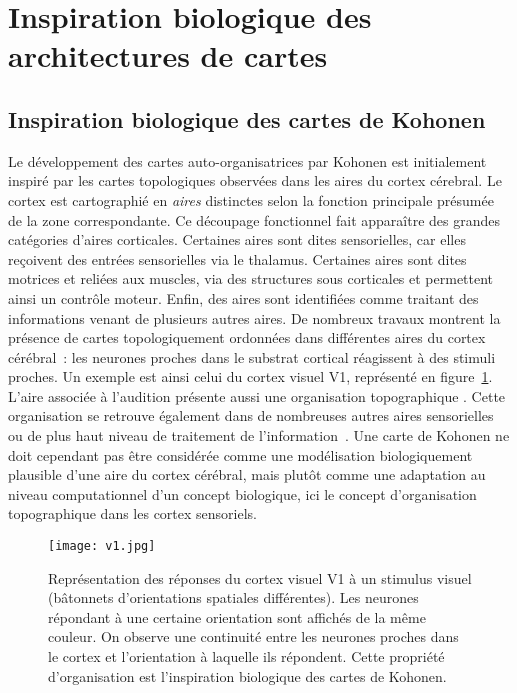 \documentclass[../main]{subfiles}
\begin{document}
\section{Inspiration biologique des architectures de cartes}\label{sec:bioinspi}

\subsection{Inspiration biologique des cartes de Kohonen}

Le développement des cartes auto-organisatrices par Kohonen est initialement inspiré par les cartes topologiques observées dans les aires du cortex cérebral. 
Le cortex est cartographié en \emph{aires} distinctes selon la fonction principale présumée de la zone correspondante.
Ce découpage fonctionnel fait apparaître des grandes catégories d'aires corticales. 
Certaines aires sont dites sensorielles, car elles reçoivent des entrées sensorielles via le thalamus. Certaines aires sont dites motrices et reliées aux muscles, via des structures sous corticales et permettent ainsi un contrôle moteur.
Enfin, des aires sont identifiées comme traitant des informations venant de plusieurs autres aires.
De nombreux travaux montrent la présence de cartes topologiquement ordonnées dans différentes aires du cortex cérébral~: les neurones proches dans le substrat cortical réagissent à des stimuli proches. 
Un exemple est ainsi celui du cortex visuel V1, représenté en figure~\ref{fig:v1}. 
L'aire associée à l'audition présente aussi une organisation topographique \parencite{Reale1980TonotopicOI}. Cette organisation se retrouve également dans de nombreuses autres aires sensorielles ou de plus haut niveau de traitement de l'information~\parencite{Kohonen1995SelfOrganizingM}. 
Une carte de Kohonen ne doit cependant pas être considérée comme une modélisation biologiquement plausible d'une aire du cortex cérébral, mais plutôt comme une adaptation au niveau computationnel d'un concept biologique, ici le concept d'organisation topographique dans les cortex sensoriels.

\begin{figure}
\centering
\texttt{[image: v1.jpg]}
\caption{Représentation des réponses du cortex visuel V1 à un stimulus visuel (bâtonnets d'orientations spatiales différentes). Les neurones répondant à une certaine orientation sont affichés de la même couleur. On observe une continuité entre les neurones proches dans le cortex et l'orientation à laquelle ils répondent. Cette propriété d'organisation est l'inspiration biologique des cartes de Kohonen.\label{fig:v1}}

\end{figure}
\end{document}
